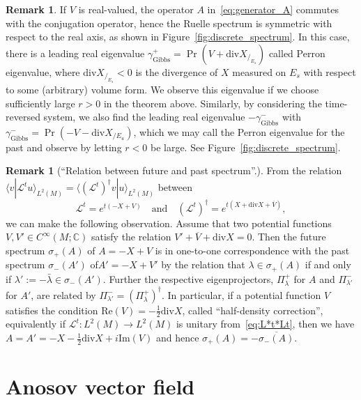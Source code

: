 \documentclass[10pt]{amsart}
\theoremstyle{definition}\newtheorem{defi}[theo]{Definition}\newtheorem{rema}[theo]{Remark}\newtheorem{exam}[theo]{Example}\newtheorem{exem}[theo]{Example}\newtheorem{nota}[theo]{Notation}
\newcommand{\clL}{\mathcal{L}}
\newcommand{\Ree}{\mathrm{Re}}
\newcommand{\Imm}{\mathrm{Im}}
\newcommand{\divv}{\mathrm{div}}
\newcommand{\Gibbs}{\mathrm{Gibbs}}
\newcommand{\bbC}{\mathbb{C}}
\begin{document}
\begin{rema}
If $V$ is real-valued, the operator $A$ in~\eqref{eq:generator_A} commutes with the conjugation operator, hence the Ruelle spectrum is symmetric with respect to the real axis, as shown in Figure~\ref{fig:discrete_spectrum}. In this case, there is a leading real eigenvalue $\gamma_{\Gibbs}^{+}=\Pr(V+\divv X_{/_{E_{s}}})$ called Perron eigenvalue, where $\divv X_{/_{E_{s}}}<0$ is the divergence of $X$ measured on $E_{s}$ with respect to some (arbitrary) volume form. We observe this eigenvalue if we choose sufficiently large $r>0$ in the theorem above. Similarly, by considering the time-reversed system, we also find the leading real eigenvalue $-\gamma_{\Gibbs}^{-}$ with $\gamma_{\Gibbs}^{-}=\Pr(-V-\divv X_{/E_{u}})$, which we may call the Perron eigenvalue for the past and observe by letting $r<0$ be large. See Figure~\ref{fig:discrete_spectrum}.
\end{rema}


\begin{rema}[{``Relation between future and past spectrum''.}]
From the relation $\langle v|\clL^{t}u\rangle_{L^{2}(M)}=\langle(\clL^{t})^{\dagger}v|u\rangle_{L^{2}(M)}$ between
\[
\clL^{t}=e^{t\left(-X+V\right)}\quad\text{and}\quad\left(\clL^{t}\right)^{\dagger}=e^{t\left(X+\divv X+\overline{V}\right)},
\]
we can make the following observation. Assume that two potential functions $V,V'\in C^{\infty}(M;\bbC)$ satisfy the relation $V'+\overline{V}+\divv X=0$. Then the future spectrum $\sigma_{+}(A)$ of $A=-X+V$ is in one-to-one correspondence with the past spectrum $\sigma_{-}(A')$ of\linebreak $A'=-X+V'$ by the relation that $\lambda\in\sigma_{+}(A)$ if and only if $\lambda':=-\bar{\lambda}\in\sigma_{-}(A')$. Further the respective eigenprojectors, $\Pi_{\lambda}^{+}$ for $A$ and $\Pi_{\lambda'}^{-}$ for $A'$, are related by $\Pi_{\lambda'}^{-}=(\Pi_{\lambda}^{+})^{\dagger}$. In particular, if a potential function $V$ satisfies the condition $\Ree(V)=-\frac{1}{2}\divv X$, called ``half-density correction'', equivalently if $\clL^{t}:L^{2}(M)\rightarrow L^{2}(M)$ is unitary from~\eqref{eq:L*t*Lt}, then we have $A=A'=-X-\frac{1}{2}\divv X+i\Imm(V)$ and hence $\sigma_{+}(A)=-\overline{\sigma_{-}(A)}$.
\end{rema}


\break
\section{Anosov vector field}\label{subsec:Anosov_def}
\end{document}
